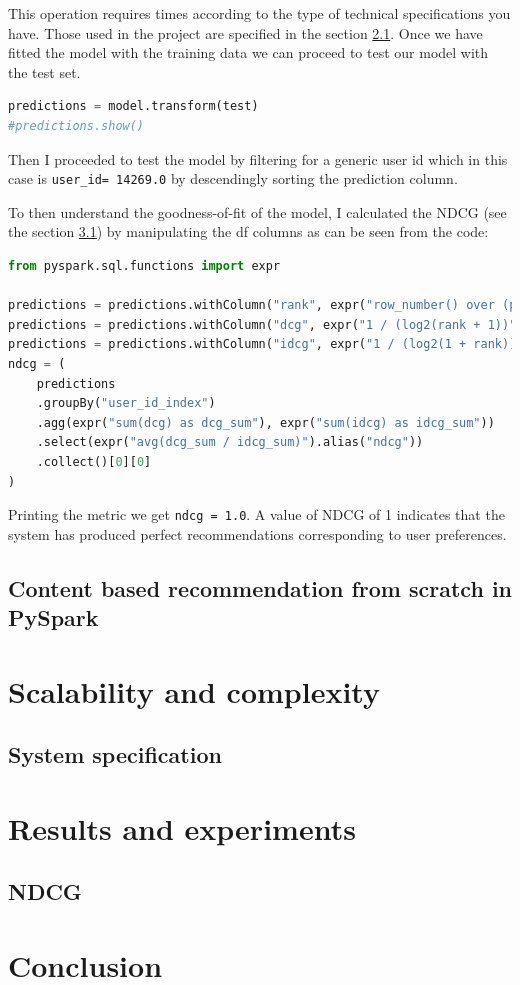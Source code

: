 \documentclass[12pt,english]{report}
\begin{document}
This operation requires times according to the type of technical specifications you have. Those used in the project are specified in the section \ref{sec:sysspec}.
Once we have fitted the model with the training data we can proceed to test our model with the test set.
\begin{lstlisting}[language={Python},escapechar=|,label={lst:predals},caption={Prediction over the test set with the ALS model}]
predictions = model.transform(test)
#predictions.show()
\end{lstlisting}
Then I proceeded to test the model by filtering for a generic user id which in this case is \texttt{user\_id\index = 14269.0} by descendingly sorting the prediction column. \par
To then understand the goodness-of-fit of the model, I calculated the NDCG (see the section \ref{sec:ndcg}) by manipulating the df columns as can be seen from the code:
\begin{lstlisting}[language={Python},escapechar=|,label={lst:ndcgals},caption={Calculating the ndcg over the predictions df obatined in ALS}]
from pyspark.sql.functions import expr

predictions = predictions.withColumn("rank", expr("row_number() over (partition by user_id_index order by prediction desc)"))
predictions = predictions.withColumn("dcg", expr("1 / (log2(rank + 1))"))
predictions = predictions.withColumn("idcg", expr("1 / (log2(1 + rank))"))
ndcg = (
    predictions
    .groupBy("user_id_index")
    .agg(expr("sum(dcg) as dcg_sum"), expr("sum(idcg) as idcg_sum"))
    .select(expr("avg(dcg_sum / idcg_sum)").alias("ndcg"))
    .collect()[0][0]
)
\end{lstlisting}
Printing the metric we get \texttt{ndcg = 1.0}. A value of NDCG of 1 indicates that the system has produced perfect recommendations corresponding to user preferences.
\section{Content based recommendation from scratch in PySpark}

\chapter{Scalability and complexity}\label{ch:scalability}
\section{System specification}\label{sec:sysspec}
\chapter{Results and experiments}\label{ch:results}
\section{NDCG}\label{sec:ndcg}
\chapter{Conclusion}\label{ch:conclusion}


\lstlistoflistings


\end{document}
